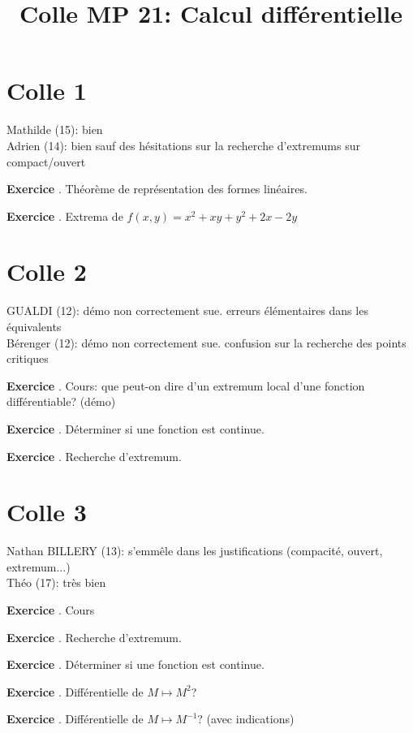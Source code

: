 \documentclass[10pt,a4paper]{article}
\title{Colle MP 21: Calcul différentielle}
\newcounter{question}
\newcounter{exo}
\newenvironment{exo}{\vspace{0.5cm}\setcounter{question}{0}\addtocounter{exo}{1} \noindent \textbf{Exercice \theexo}. \normalsize }{\par}
\begin{document}
	\maketitle
	
	\section*{Colle 1}	
	Mathilde (15): bien \\
	Adrien (14): bien sauf des hésitations sur la recherche d'extremums sur compact/ouvert\\
	
	\begin{exo}
		Théorème de représentation des formes linéaires.
	\end{exo}

	\begin{exo}
		Extrema de $f(x, y) = x^2 + xy + y^2 + 2x - 2y$
	\end{exo}	
			
	\section*{Colle 2}
	\setcounter{exo}{0}
	GUALDI (12): démo non correctement sue. erreurs élémentaires dans les équivalents\\
	Bérenger (12): démo non correctement sue. confusion sur la recherche des points critiques\\
	
	\begin{exo}
		Cours: que peut-on dire d'un extremum local d'une fonction différentiable? (démo)
	\end{exo}

	\begin{exo}
		Déterminer si une fonction est continue.
	\end{exo}	
	
	\begin{exo}
		Recherche d'extremum.
	\end{exo}	
	
	\section*{Colle 3}
	\setcounter{exo}{0}
	Nathan BILLERY (13): s'emmêle dans les justifications (compacité, ouvert, extremum...)\\
	Théo (17): très bien\\
	
	\begin{exo}
		Cours
	\end{exo}

	\begin{exo}
		Recherche d'extremum.
	\end{exo}	

	\begin{exo}
		Déterminer si une fonction est continue.
	\end{exo}	
	
	\begin{exo}
		Différentielle de $M \longmapsto M^2$?
	\end{exo}	
	\begin{exo}
		Différentielle de $M \longmapsto M^{-1}$? (avec indications)
	\end{exo}
\end{document}
